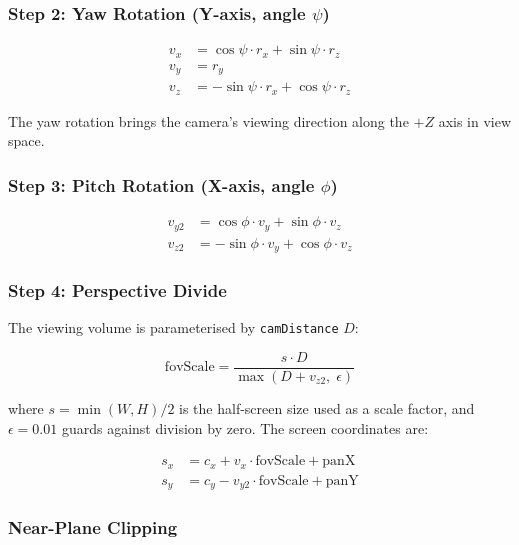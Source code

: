 \documentclass[12pt, a4paper]{report}
\theoremstyle{definition}
\theoremstyle{remark}
\begin{document}
\subsubsection{Step 2: Yaw Rotation (Y-axis, angle $\psi$)}

\begin{align}
v_x &=  \cos\psi \cdot r_x + \sin\psi \cdot r_z \\
v_y &= r_y \\
v_z &= -\sin\psi \cdot r_x + \cos\psi \cdot r_z
\end{align}

The yaw rotation brings the camera's viewing direction along the $+Z$ axis
in view space.

\subsubsection{Step 3: Pitch Rotation (X-axis, angle $\phi$)}

\begin{align}
v_{y2} &=  \cos\phi \cdot v_y + \sin\phi \cdot v_z \\
v_{z2} &= -\sin\phi \cdot v_y + \cos\phi \cdot v_z
\end{align}

\subsubsection{Step 4: Perspective Divide}

The viewing volume is parameterised by \texttt{camDistance} $D$:

\begin{equation}
\text{fovScale} = \frac{s \cdot D}{\max(D + v_{z2},\; \epsilon)}
\label{eq:fovscale}
\end{equation}

where $s = \min(W, H) / 2$ is the half-screen size used as a scale
factor, and $\epsilon = 0.01$ guards against division by zero.
The screen coordinates are:

\begin{align}
  s_x &= c_x + v_x \cdot \text{fovScale} + \text{panX} \\
  s_y &= c_y - v_{y2} \cdot \text{fovScale} + \text{panY}
\end{align}

\subsubsection{Near-Plane Clipping}
\end{document}
